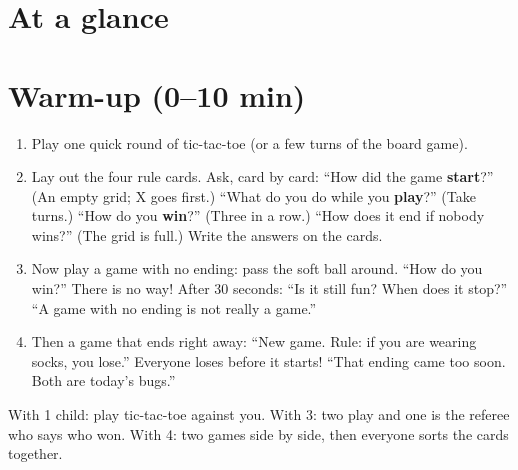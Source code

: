 \section{At a glance}
\begin{timeplan}
\end{timeplan}

\section{Warm-up (0--10 min)}
\begin{unplugged}
\begin{enumerate}[leftmargin=1.4em,itemsep=1pt]
  \item Play one quick round of tic-tac-toe (or a few turns of the board game).
  \item Lay out the four rule cards. Ask, card by card: \enquote{How did the game \textbf{start}?} (An empty grid; X goes first.) \enquote{What do you do while you \textbf{play}?} (Take turns.) \enquote{How do you \textbf{win}?} (Three in a row.) \enquote{How does it end if nobody wins?} (The grid is full.) Write the answers on the cards.
  \item Now play a game with no ending: pass the soft ball around. \enquote{How do you win?} There is no way! After 30 seconds: \enquote{Is it still fun? When does it stop?} \enquote{A game with no ending is not really a game.}
  \item Then a game that ends right away: \enquote{New game. Rule: if you are wearing socks, you lose.} Everyone loses before it starts! \enquote{That ending came too soon. Both are today's bugs.}
\end{enumerate}
With 1 child: play tic-tac-toe against you. With 3: two play and one is the referee who says who won. With 4: two games side by side, then everyone sorts the cards together.
\end{unplugged}

